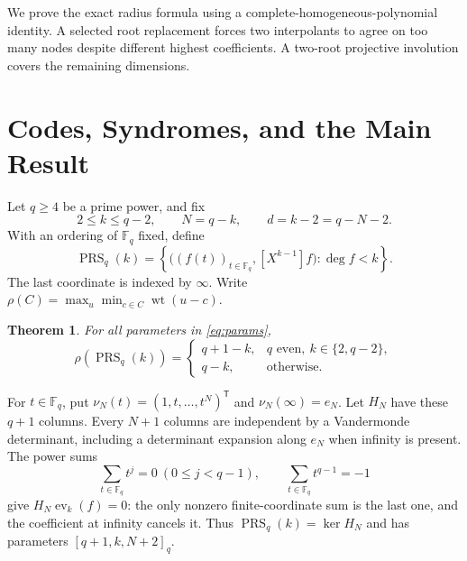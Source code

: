 \documentclass[12pt,letterpaper,onecolumn]{article}
\newtheorem{theorem}{Theorem}[section]
\theoremstyle{definition}
\newcommand{\F}{\mathbb F}
\newcommand{\PRS}{\operatorname{PRS}}
\newcommand{\wt}{\operatorname{wt}}
\begin{document}
We prove the exact radius formula using a complete-homogeneous-polynomial identity. A selected root replacement forces two interpolants to agree on too many nodes despite different highest coefficients. A two-root projective involution covers the remaining dimensions.

\section{Codes, Syndromes, and the Main Result}
Let $q\ge4$ be a prime power, and fix
\begin{equation}
 2\le k\le q-2,\qquad N=q-k,\qquad d=k-2=q-N-2.
 \label{eq:params}
\end{equation}
With an ordering of $\F_q$ fixed, define
\begin{equation}
 \PRS_q(k)=\left\{\bigl((f(t))_{t\in\F_q},[X^{k-1}]f\bigr):\deg f<k\right\}.
 \label{eq:prs}
\end{equation}
The last coordinate is indexed by $\infty$. Write $\rho(C)=\max_u\min_{c\in C}\wt(u-c)$.

\begin{theorem}\label{thm:main}
For all parameters in \eqref{eq:params},
\begin{equation}
 \rho(\PRS_q(k))=
 \begin{cases}
 q+1-k,&q\text{ even},\ k\in\{2,q-2\},\\
 q-k,&\text{otherwise}.
 \end{cases}
 \label{eq:radius}
\end{equation}
\end{theorem}

For $t\in\F_q$, put $\nu_N(t)=(1,t,\ldots,t^N)^{\mathsf T}$ and $\nu_N(\infty)=e_N$. Let $H_N$ have these $q+1$ columns. Every $N+1$ columns are independent by a Vandermonde determinant, including a determinant expansion along $e_N$ when infinity is present. The power sums
\begin{equation}
 \sum_{t\in\F_q}t^j=0\ (0\le j<q-1),\qquad
 \sum_{t\in\F_q}t^{q-1}=-1
 \label{eq:sums}
\end{equation}
give $H_N\operatorname{ev}_k(f)=0$: the only nonzero finite-coordinate sum is the last one, and the coefficient at infinity cancels it. Thus $\PRS_q(k)=\ker H_N$ and has parameters $[q+1,k,N+2]_q$.
\end{document}
